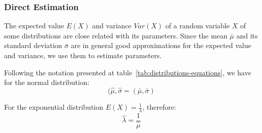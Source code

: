 \begin{figure}[ht!]
\centering
{}
\label{fig:linearization-cost}
\end{figure}



\subsubsection{Direct Estimation}

The expected value $E(X)$ and variance $Var(X)$ of a random variable $X$ of some distributions are close related with its parameters. Since the mean $\bar{\mu}$ and its standard deviation $\bar{\sigma}$ are in general good approximations for the expected value and variance, we use them to estimate parameters.

Following the notation presented at table~\ref{tab:distributions-equations}, we have for the normal distribution:
\begin{equation}
(\hat{\mu}, \hat{\sigma} = (\bar{\mu}, \bar{\sigma})
\end{equation}

For the exponential distribution $E(X) = \frac{1}{\lambda}$, therefore:
\begin{equation}
\hat{\lambda} = \frac{1}{\hat{\mu}}
\end{equation} 

